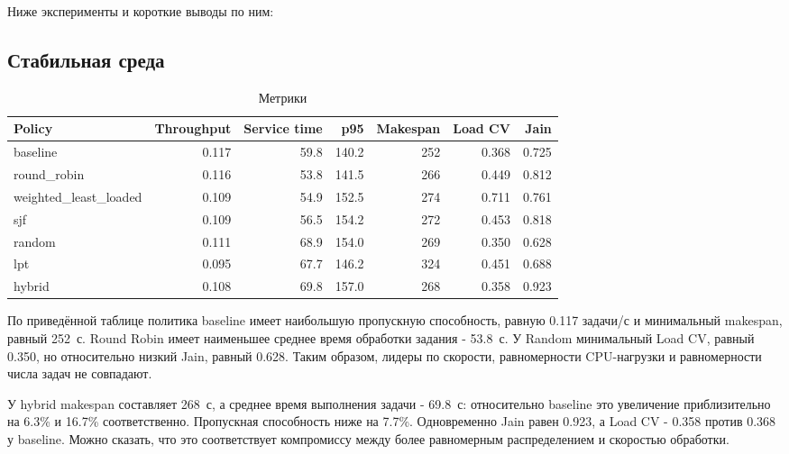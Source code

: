 \documentclass[a4paper,12pt]{extarticle}
\begin{document}
Ниже эксперименты и короткие выводы по ним:

\subsection{Стабильная среда}

\begin{table}[H]
\centering
    \caption{Метрики}
\footnotesize
\begin{tabular}{lrrrrrr}
\toprule
Policy & Throughput & Service time & p95 & Makespan & Load CV & Jain \\
\midrule
    baseline & 0.117 & 59.8 & 140.2 & 252 & 0.368 & 0.725 \\
    round\_robin & 0.116 & 53.8 & 141.5 & 266 & 0.449 & 0.812 \\
    weighted\_least\_loaded & 0.109 & 54.9 & 152.5 & 274 & 0.711 & 0.761 \\
    sjf & 0.109 & 56.5 & 154.2 & 272 & 0.453 & 0.818 \\
    random & 0.111 & 68.9 & 154.0 & 269 & 0.350 & 0.628 \\
    lpt & 0.095 & 67.7 & 146.2 & 324 & 0.451 & 0.688 \\
    hybrid & 0.108 & 69.8 & 157.0 & 268 & 0.358 & 0.923 \\
\bottomrule
\end{tabular}
\end{table}

По приведённой таблице политика baseline имеет наибольшую пропускную способность, равную 0.117 задачи/с и минимальный makespan, равный 252~с. Round Robin имеет наименьшее среднее время обработки задания - 53.8~с. У Random минимальный Load CV, равный 0.350, но относительно низкий Jain, равный 0.628. Таким образом, лидеры по скорости, равномерности CPU-нагрузки и равномерности числа задач не совпадают.

У hybrid makespan составляет 268~с, а среднее время выполнения задачи - 69.8~с: относительно baseline это увеличение приблизительно на 6.3\% и 16.7\% соответственно. Пропускная способность ниже на 7.7\%. Одновременно Jain равен 0.923, а Load CV - 0.358 против 0.368 у baseline. Можно сказать, что это соответствует компромиссу между более равномерным распределением и скоростью обработки.
\end{document}
